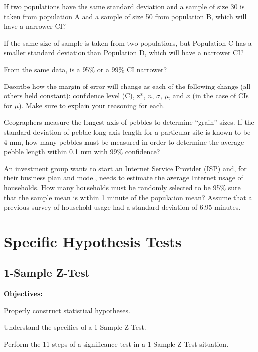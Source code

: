 \documentclass[10pt,openany]{book}\usepackage[]{graphicx}\usepackage[]{color}
\begin{document}
\begin{minipage}{\textwidth}
\begin{exsection}
  \item \label{revex:CIABn} If two populations have the same standard deviation and a sample of size 30 is taken from population A and a sample of size 50 from population B, which will have a narrower CI? 
  \item \label{revex:CIABs} If the same size of sample is taken from two populations, but Population C has a smaller standard deviation than Population D, which will have a narrower CI? 
  \item \label{revex:CIC} From the same data, is a 95\% or a 99\% CI narrower? 
  \item \label{revex:CIdescribe} Describe how the margin of error will change as each of the following change (all others held constant): confidence level (C), z*, $n$, $\sigma$, $\mu$, and $\bar{x}$ (in the case of CIs for $\mu$).  Make sure to explain your reasoning for each. 
  \item \label{revex:CIPebbles} Geographers measure the longest axis of pebbles to determine ``grain'' sizes.  If the standard deviation of pebble long-axis length for a particular site is known to be 4 mm, how many pebbles must be measured in order to determine the average pebble length within 0.1 mm with 99\% confidence? 
  \item \label{revex:CIISP} An investment group wants to start an Internet Service Provider (ISP) and, for their business plan and model, needs to estimate the average Internet usage of households.  How many households must be randomly selected to be 95\% sure that the sample mean is within 1 minute of the population mean?  Assume that a previous survey of household usage had a standard deviation of 6.95 minutes. 
\end{exsection}
\end{minipage}

    \part{Specific Hypothesis Tests}



\chapter{1-Sample Z-Test} \label{chap:ZTest}
\begin{ChapObj}{\boxwidth}
  \textbf{Objectives:}
  \begin{Enumerate}
    \item Properly construct statistical hypotheses.
    \item Understand the specifics of a 1-Sample Z-Test.
    \item Perform the 11-steps of a significance test in a 1-Sample Z-Test situation.
  \end{Enumerate}
\end{ChapObj}
\end{document}
